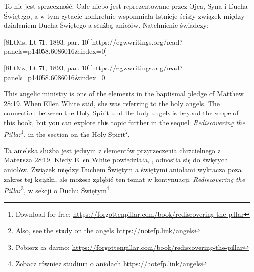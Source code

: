 To nie jest sprzeczność. Całe niebo jest reprezentowane przez Ojca, Syna i Ducha Świętego, a w tym cytacie konkretnie wspomniała  Istnieje ścisły związek między działaniem Ducha Świętego a służbą aniołów. Natchnienie świadczy:


[8LtMs, Lt 71, 1893, par. 10][https://egwwritings.org/read?panels=p14058.6086016&index=0]


[8LtMs, Lt 71, 1893, par. 10][https://egwwritings.org/read?panels=p14058.6086016&index=0]


This angelic ministry is one of the elements in the baptismal pledge of Matthew 28:19. When Ellen White said,  she was referring to the holy angels. The connection between the Holy Spirit and the holy angels is beyond the scope of this book, but you can explore this topic further in the sequel, \textit{Rediscovering the Pillar}\footnote{Download for free: \href{https://forgottenpillar.com/book/rediscovering-the-pillar}{https://forgottenpillar.com/book/rediscovering-the-pillar}}, in the section on the Holy Spirit\footnote{Also, see the study on the angels \href{https://notefp.link/angels}{https://notefp.link/angels}}.


Ta anielska służba jest jednym z elementów przyrzeczenia chrzcielnego z Mateusza 28:19. Kiedy Ellen White powiedziała, , odnosiła się do świętych aniołów. Związek między Duchem Świętym a świętymi aniołami wykracza poza zakres tej książki, ale możesz zgłębić ten temat w kontynuacji, \textit{Rediscovering the Pillar}\footnote{Pobierz za darmo: \href{https://forgottenpillar.com/book/rediscovering-the-pillar}{https://forgottenpillar.com/book/rediscovering-the-pillar}}, w sekcji o Duchu Świętym\footnote{Zobacz również studium o aniołach \href{https://notefp.link/angels}{https://notefp.link/angels}}.